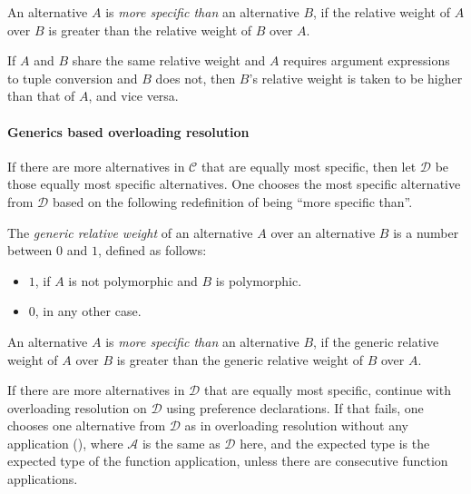 An alternative $A$ is {\em more specific than} an alternative $B$, if the relative weight of $A$ over $B$ is greater than the relative weight of $B$ over $A$. 

If $A$ and $B$ share the same relative weight and $A$ requires argument expressions to tuple conversion and $B$ does not, then $B$'s relative weight is taken to be higher than that of $A$, and vice versa. 

\paragraph{Generics based overloading resolution}
If there are more alternatives in $\mathcal{C}$ that are equally most specific, then let $\mathcal{D}$ be those equally most specific alternatives. One chooses the most specific alternative from $\mathcal{D}$ based on the following redefinition of being ``more specific than''. 

\begin{definition}
The {\em generic relative weight} of an alternative $A$ over an alternative $B$ is a number between $0$ and $1$, defined as follows:
\begin{itemize}
  \item $1$, if $A$ is not polymorphic and $B$ is polymorphic. 
  \item $0$, in any other case. 
\end{itemize}
\end{definition}

An alternative $A$ is {\em more specific than} an alternative $B$, if the generic relative weight of $A$ over $B$ is greater than the generic relative weight of $B$ over $A$. 

If there are more alternatives in $\mathcal{D}$ that are equally most specific, continue with overloading resolution on $\mathcal{D}$ using preference declarations. If that fails, one chooses one alternative from $\mathcal{D}$ as in overloading resolution without any application (), where $\mathcal{A}$ is the same as $\mathcal{D}$ here, and the expected type is the expected type of the function application, unless there are consecutive function applications. 


